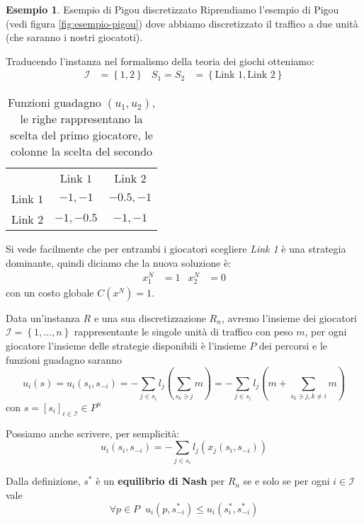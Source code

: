 \documentclass[a4paper]{article}
\newcounter{counter1}
\theoremstyle{plain}
\theoremstyle{definition}
\newtheorem{myes}[counter1]{Esempio}
\theoremstyle{remark}
\newcommand{\set}[1]{\left\{#1\right\}}
\newcommand{\pa}[1]{\left(#1\right)}
\newcommand{\bra}[1]{\left[#1\right]}
\begin{document}
\begin{myes}{Esempio di Pigou discretizzato}
  Riprendiamo l'esempio di Pigou (vedi figura \ref{fig:esempio-pigou})
  dove abbiamo discretizzato il traffico a due unità (che saranno i
  nostri giocatoti).

  Traducendo l'instanza nel formalismo della teoria dei giochi
  otteniamo:
  \begin{align*}
    \mathcal{I} &= \set{1,2} & S_1 = S_2 & = \set{\text{Link 1},
                                           \text{Link 2}}
  \end{align*}
  \begin{table}[!ht]
    \centering
    \begin{tabular}{rcc}
      & Link $1$ & Link $2$ \\
      \cline{2-3}
      Link $1$ & \multicolumn{1}{|c|}{$-1,-1$} & \multicolumn{1}{|c|}{$-0.5,-1$}  \\
      \cline{2-3}
      Link $2$ & \multicolumn{1}{|c|}{$-1,-0.5$} & \multicolumn{1}{|c|}{$-1,-1$}  \\
      \cline{2-3}
    \end{tabular}
    \caption{Funzioni guadagno $(u_1,u_2)$, le righe rappresentano la
      scelta del primo giocatore, le colonne la scelta del secondo}
    \label{tab:pigou-nash}
  \end{table}

  Si vede facilmente che per entrambi i giocatori scegliere
  \textit{Link 1} è una strategia dominante, quindi diciamo che la
  nuova soluzione è:
  \begin{align*}
    x^{N}_1 &= 1 & x^{N}_2 &= 0
  \end{align*}
  con un costo globale $C\pa{x^{N}} = 1$.
\end{myes}

Data un'instanza $R$ e una sua discretizzazione $R_n$, avremo
l'insieme dei giocatori $\mathcal{I} = \set{1,...,n}$ rappresentante
le singole unità di traffico con peso $m$, per ogni giocatore
l'insieme delle strategie disponibili è l'insieme $P$ dei percorsi e
le funzioni guadagno saranno
\[ u_i \pa{s} = u_i\pa{s_i, s_{-i}} = - \sum _{j\in s_i}
  l_j\pa{\sum_{s_k\ni j} m} = -\sum _{j\in s_i} l_j\pa{m + \sum_{s_k\ni
      j,k\neq i} m} \]
con $s = \bra{s_i}_{i\in\mathcal{I}} \in P^n$

Possiamo anche scrivere, per semplicità:
\[ u_i\pa{s_i, s_{-i}} = - \sum _{j\in s_i} l_j\pa{x_j\pa{s_i, s_{-i}}} \]


Dalla definizione, $s^*$ è un \textbf{equilibrio di Nash} per $R_n$ se
e solo se per ogni $i\in \mathcal{I}$ vale
\[ \forall p\in P \;\; u_i \pa{p,s^*_{-i}} \le u_i\pa{s^*_i,s^*_{-i}} \]
\end{document}
